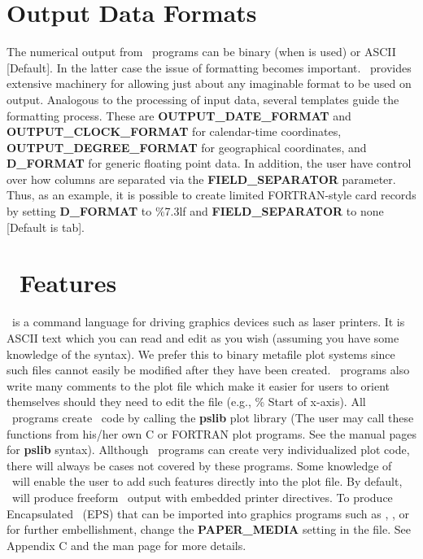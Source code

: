 \section{Output Data Formats}

The numerical output from \GMT\ programs can be binary (when  is used) or ASCII [Default].
In the latter case the issue of formatting becomes important.  \GMT\ provides extensive
machinery for allowing just about any imaginable format to be used on output.  Analogous to
the processing of input data, several templates guide the formatting process.  These are
{\bf OUTPUT\_DATE\_FORMAT} and {\bf OUTPUT\_CLOCK\_FORMAT} for calendar-time coordinates,
{\bf OUTPUT\_DEGREE\_FORMAT} for geographical coordinates, and {\bf D\_FORMAT} for generic
floating point data.  In addition, the user have control over how columns are separated via
the {\bf FIELD\_SEPARATOR} parameter.  Thus, as an example, it is possible to create limited
FORTRAN-style card records by setting {\bf D\_FORMAT} to \%7.3lf and {\bf FIELD\_SEPARATOR} to
none [Default is tab].

\section{\PS\ Features}
\PS\ is a command language for driving graphics
devices such as laser printers.  It is ASCII text which you
can read and edit as you wish (assuming you have some knowledge
of the syntax).  We prefer this to binary metafile plot
systems since such files cannot easily be modified after they
have been created.  \GMT\ programs also write many comments to
the plot file which make it easier for users to orient
themselves should they need to edit the file (e.g., \% Start
of x-axis).  All \GMT\ programs create \PS\ code by
calling the {\bf pslib} plot library (The user may call these
functions from his/her own C or FORTRAN plot programs. See the
manual pages for {\bf pslib} syntax).  Allthough \GMT\ programs
can create very individualized plot code, there will always be
cases not covered by these programs.  Some knowledge of
\PS\ will enable the user to add such features
directly into the plot file.  By default, \GMT\ will produce
freeform \PS\ output with embedded printer directives.  To
produce Encapsulated \PS\ (EPS) that can be imported into graphics programs such as
, ,  or  for further
embellishment, change the {\bf PAPER\_MEDIA} setting in the 
file.  See Appendix C and the  man page for more details.

